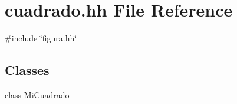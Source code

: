 \hypertarget{cuadrado_8hh}{\section{cuadrado.\-hh \-File \-Reference}
\label{cuadrado_8hh}
}
{\ttfamily \#include \char`\"{}figura.\-hh\char`\"{}}\*
\subsection*{\-Classes}
\begin{DoxyCompactItemize}
\item 
class \hyperlink{class_mi_cuadrado}{\-Mi\-Cuadrado}
\end{DoxyCompactItemize}
